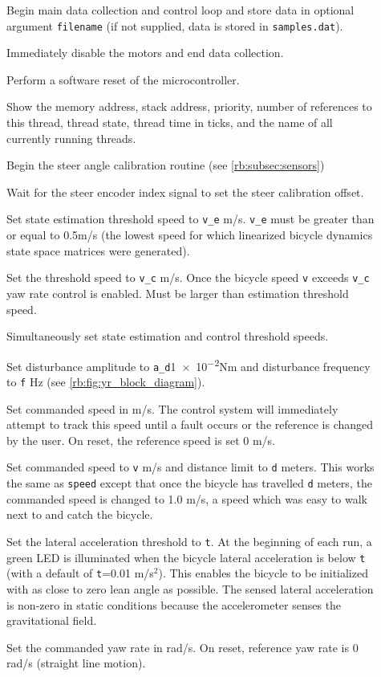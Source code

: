 \begin{description}
  \item[] Begin main data collection and control loop and store
    data in optional argument \verb|filename| (if not supplied, data is stored in
    \verb|samples.dat|).
  \item[] Immediately disable the motors and end data collection.
  \item[] Perform a software reset of the microcontroller.
  \item[] Show the memory address, stack address, priority, number
    of references to this thread, thread state, thread time in ticks, and the
    name of all currently running threads.
  \item[] Begin the steer angle calibration routine (see
    \autoref{rb:subsec:sensors})
  \item[] Wait for the steer encoder index signal to set the steer calibration offset.
  \item[] Set state estimation threshold speed to \verb|v_e| m/s.
    \verb|v_e| must be greater than or equal to 0.5m/s (the lowest speed
    for which linearized bicycle dynamics state space matrices were generated).
  \item[] Set the threshold speed to \verb|v_c| m/s. Once the
    bicycle speed \verb|v| exceeds \verb|v_c| yaw rate control is enabled. Must
    be larger than estimation threshold speed.
  \item[] Simultaneously set state estimation and control threshold speeds.
  \item[] Set disturbance amplitude to \verb|a_d|\num{1e-2}Nm
    and disturbance frequency to \verb|f| Hz (see
    \autoref{rb:fig:yr_block_diagram}).
  \item[] Set commanded speed in m/s. The control system will
    immediately attempt to track this speed until a fault occurs or the
    reference is changed by the user. On reset, the reference speed is set 0
    m/s.
  \item[] Set commanded speed to \verb|v| m/s and distance
    limit to \verb|d| meters. This works the same as \verb|speed| except that
    once the bicycle has travelled \verb|d| meters, the commanded speed is
    changed to 1.0 m/s, a speed which was easy to walk next to and catch the
    bicycle.
  \item[] Set the lateral acceleration threshold to \verb|t|. At
    the beginning of each run, a green LED is illuminated when the bicycle
    lateral acceleration is below \verb|t| (with a default of \verb|t|=0.01
    m/s$^2$). This enables the bicycle to be initialized with as close to zero
    lean angle as possible. The sensed lateral acceleration is non-zero in
    static conditions because the accelerometer senses the gravitational field.
  \item[\Q{yaw_rate yr] Set the commanded yaw rate in rad/s. On
    reset, reference yaw rate is 0 rad/s (straight line motion).

\end{description}

